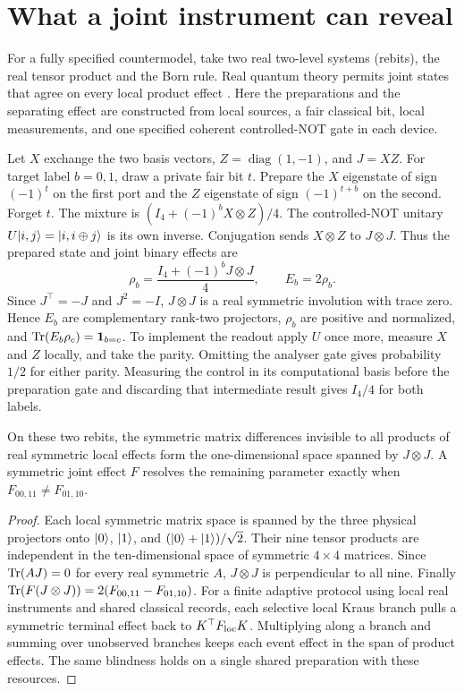 \section{What a joint instrument can reveal}
For a fully specified countermodel, take two real two-level systems (rebits), the real tensor product and the Born rule. Real quantum theory permits joint states that agree on every local product effect \citep{hardy2012real}. Here the preparations and the separating effect are constructed from local sources, a fair classical bit, local measurements, and one specified coherent controlled-NOT gate in each device.

Let $X$ exchange the two basis vectors, $Z=\operatorname{diag}(1,-1)$, and $J=XZ$. For target label $b=0,1$, draw a private fair bit $t$. Prepare the $X$ eigenstate of sign $(-1)^t$ on the first port and the $Z$ eigenstate of sign $(-1)^{t+b}$ on the second. Forget $t$. The mixture is $(I_4+(-1)^b X\otimes Z)/4$. The controlled-NOT unitary $U\lvert i,j\rangle=\lvert i,i\oplus j\rangle$ is its own inverse. Conjugation sends $X\otimes Z$ to $J\otimes J$. Thus the prepared state and joint binary effects are
\begin{equation}
 \rho_b=\frac{I_4+(-1)^bJ\otimes J}{4},
 \qquad E_b=2\rho_b .
\label{eq:rebit}
\end{equation}
Since $J^\top=-J$ and $J^2=-I$, $J\otimes J$ is a real symmetric involution with trace zero. Hence $E_b$ are complementary rank-two projectors, $\rho_b$ are positive and normalized, and $\operatorname{Tr}(E_b\rho_c)=\mathbf1_{b=c}$. To implement the readout apply $U$ once more, measure $X$ and $Z$ locally, and take the parity. Omitting the analyser gate gives probability $1/2$ for either parity. Measuring the control in its computational basis before the preparation gate and discarding that intermediate result gives $I_4/4$ for both labels.

\begin{proposition}\label{prop:rebit}
On these two rebits, the symmetric matrix differences invisible to all products of real symmetric local effects form the one-dimensional space spanned by $J\otimes J$. A symmetric joint effect $F$ resolves the remaining parameter exactly when $F_{00,11}\ne F_{01,10}$.
\end{proposition}
\begin{proof}
Each local symmetric matrix space is spanned by the three physical projectors onto $\lvert 0\rangle$, $\lvert 1\rangle$, and $(\lvert 0\rangle+\lvert 1\rangle)/\sqrt2$. Their nine tensor products are independent in the ten-dimensional space of symmetric $4\times4$ matrices. Since $\operatorname{Tr}(AJ)=0$ for every real symmetric $A$, $J\otimes J$ is perpendicular to all nine. Finally $\operatorname{Tr}(F(J\otimes J))=2(F_{00,11}-F_{01,10})$. For a finite adaptive protocol using local real instruments and shared classical records, each selective local Kraus branch pulls a symmetric terminal effect back to $K^\top F_{\rm loc}K$. Multiplying along a branch and summing over unobserved branches keeps each event effect in the span of product effects. The same blindness holds on a single shared preparation with these resources.
\end{proof}


